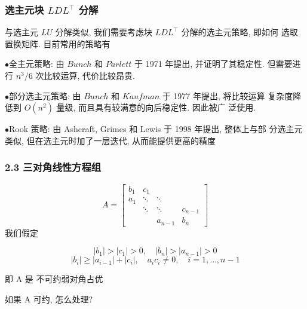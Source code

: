 \documentclass[notheorems,serif]{beamer}
\begin{document}
\begin{frame}
\frametitle{选主元块 $LDL^{\top}$ 分解}
与选主元 $LU$ 分解类似, 我们需要考虑块 $LDL^{\top}$ 分解的选主元策略, 即如何
选取置换矩阵. 目前常用的策略有

$\bullet$全主元策略: 由 $Bunch$ 和 $Parlett$ 于 1971 年提出, 并证明了其稳定性.
但需要进行 $n^3/6$ 次比较运算, 代价比较昂贵.

$\bullet$部分选主元策略: 由 $Bunch$ 和 $Kaufman$ 于 1977 年提出, 将比较运算
复杂度降低到 $O(n^2)$ 量级, 而且具有较满意的向后稳定性. 因此被广
泛使用.

$\bullet$Rook 策略: 由 Ashcraft, Grimes 和 Lewis 于 1998 年提出, 整体上与部
分选主元类似, 但在选主元时加了一层迭代, 从而能提供更高的精度


{}
\end{frame}

\begin{frame}
\frametitle{2.3 \quad 三对角线性方程组}
\begin{equation}
A=\left[\begin{array}{cccc}{b_{1}} & {c_{1}} & {} & {} \\ {a_{1}} & {\ddots} & {\ddots} & {} \\ {} & {\ddots} & {\ddots} & {c_{n-1}} \\ {} & {} & {a_{n-1}} & {b_{n}}\end{array}\right]
\end{equation}
我们假定

\begin{equation}
\left|b_{1}\right|>\left|c_{1}\right|>0, \quad\left|b_{n}\right|>\left|a_{n-1}\right|>0
\end{equation}
\begin{equation}
\left|b_{i}\right| \geq\left|a_{i-1}\right|+\left|c_{i}\right|, \quad a_{i} c_{i} \neq 0, \quad i=1, \ldots, n-1
\end{equation}

即 A 是 不可约弱对角占优

如果 A 可约, 怎么处理?
\end{frame}
\end{document}
